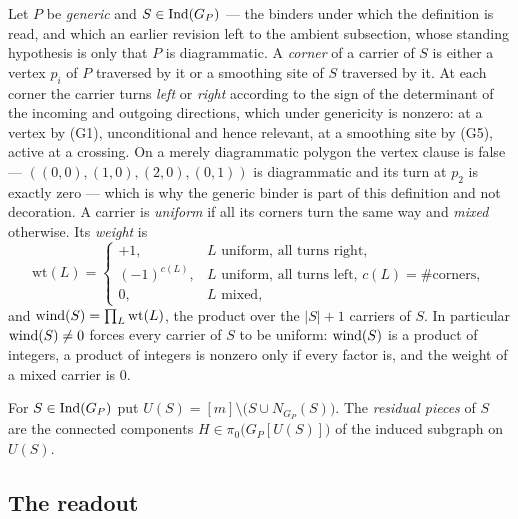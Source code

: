 \begin{definition}\label{def:wind}
Let $P$ be \emph{generic} and $S\in\operatorname{Ind}(G_P)$ --- the binders under which the
definition is read, and which an earlier revision left to the ambient
subsection, whose standing hypothesis is only that $P$ is diagrammatic. A
\emph{corner} of a carrier of $S$ is either a vertex $p_i$ of $P$ traversed by
it or a smoothing site of $S$ traversed by it. At each corner the carrier turns
\emph{left} or \emph{right} according to the sign of the determinant of the
incoming and outgoing directions, which under genericity is nonzero: at a
vertex by (G1), unconditional and hence relevant, at a smoothing site by (G5),
active at a crossing. On a merely diagrammatic polygon the vertex clause is
false --- $((0,0),(1,0),(2,0),(0,1))$ is diagrammatic and its turn at $p_2$ is
exactly zero --- which is why the generic binder is part of this definition and
not decoration. A carrier is \emph{uniform} if all its corners turn the
same way and \emph{mixed} otherwise. Its \emph{weight} is
\[
   \mathrm{wt}(L)=\begin{cases}
     +1, & L \text{ uniform, all turns right},\\
     (-1)^{c(L)}, & L \text{ uniform, all turns left, } c(L)=\#\text{corners},\\
     0, & L \text{ mixed},
   \end{cases}
\]
and $\operatorname{wind}(S)=\prod_{L}\mathrm{wt}(L)$, the product over the $|S|+1$ carriers of
$S$. In particular $\operatorname{wind}(S)\neq0$ forces every carrier of $S$ to be
uniform: $\operatorname{wind}(S)$ is a product of integers, a product of integers is
nonzero only if every factor is, and the weight of a mixed carrier is $0$.
\end{definition}

\begin{definition}\label{def:pieces}
For $S\in\operatorname{Ind}(G_P)$ put $U(S)=[m]\setminus\bigl(S\cup N_{G_P}(S)\bigr)$. The
\emph{residual pieces} of $S$ are the connected components
$H\in\pi_0\bigl(G_P[U(S)]\bigr)$ of the induced subgraph on $U(S)$.
\end{definition}

\subsection{The readout}

